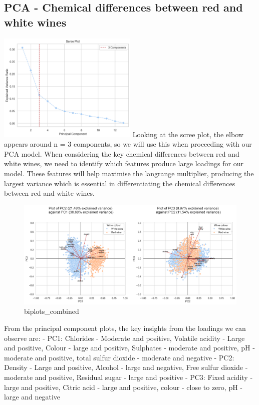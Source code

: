 \documentclass[
]{article}
\begin{document}
\subsection{PCA - Chemical differences between red and white
wines}\label{pca---chemical-differences-between-red-and-white-wines}

\includegraphics[width=0.5\textwidth,height=\textheight]{Scree_plot.png}
Looking at the scree plot, the elbow appears around n = 3 components, so
we will use this when proceeding with our PCA model. When considering
the key chemical differences between red and white wines, we need to
identify which features produce large loadings for our model. These
features will help maximise the langrange multiplier, producing the
largest variance which is essential in differentiating the chemical
differences between red and white wines.

\begin{figure}
\centering
\includegraphics{biplots_combined.png}
\caption{biplots\_combined}
\end{figure}

From the principal component plots, the key insights from the loadings
we can observe are: - PC1: Chlorides - Moderate and positive, Volatile
acidity - Large and positive, Colour - large and positive, Sulphates -
moderate and positive, pH - moderate and positive, total sulfur dioxide
- moderate and negative - PC2: Density - Large and positive, Alcohol -
large and negative, Free sulfur dioxide - moderate and positive,
Residual sugar - large and positive - PC3: Fixed acidity - large and
positive, Citric acid - large and positive, colour - close to zero, pH -
large and negative
\end{document}
